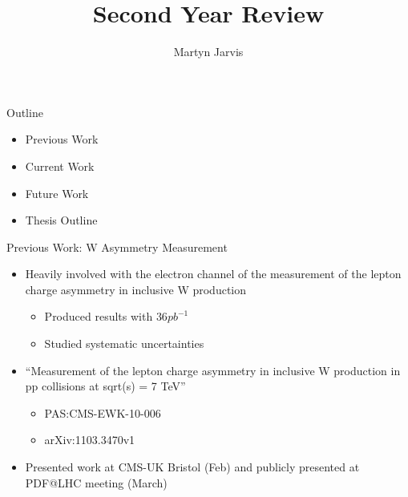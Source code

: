 \documentclass[t]{beamer}
\author{Martyn Jarvis}
\title[2nd Year Review]{Second Year Review}
\begin{document}


 \begin{frame}{Outline}
 \vspace{1cm}
     \begin{itemize}  
       \item Previous Work
       \item Current Work
       \item Future Work
       \item Thesis Outline
     \end{itemize}  
 \end{frame}
 
 \begin{frame}{Previous Work: W Asymmetry Measurement}
     \begin{itemize}
       \item Heavily involved with the electron channel of the measurement of the lepton charge asymmetry in inclusive W production
         \begin{itemize}
 	  \item Produced results with $36pb^{-1}$
 	  \item Studied systematic uncertainties
 	\end{itemize}
       \item \alert{``Measurement of the lepton charge asymmetry in inclusive W production in pp collisions at sqrt(s) = 7 TeV''} 
         \begin{itemize}
 	  \item PAS:CMS-EWK-10-006
 	  \item arXiv:1103.3470v1
 	\end{itemize}
       \item Presented work at CMS-UK Bristol (Feb) and publicly presented at PDF@LHC meeting (March)
     \end{itemize}
 \end{frame}
 
\end{document}
